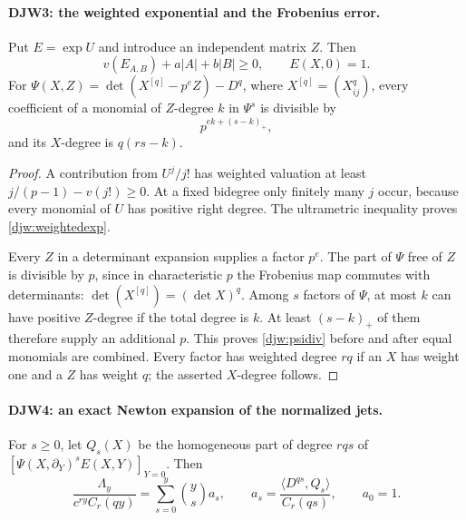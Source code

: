 \documentclass[11pt,a4paper]{article}
\numberwithin{equation}{section}
\theoremstyle{remark}\newtheorem{remark}[theorem]{Remark}
\begin{document}
\paragraph{DJW3: the weighted exponential and the Frobenius error.}
\label{claim:DJW3}
Put $E=\exp U$ and introduce an independent matrix $Z$.
Then
\begin{equation}
 v(E_{A,B})+a|A|+b|B|\ge0,\qquad E(X,0)=1.
 \label{djw:weightedexp}
\end{equation}
For
$\Psi(X,Z)=\det(X^{[q]}-p^eZ)-D^q$, where
$X^{[q]}=(X_{ij}^q)$, every coefficient of a monomial of
$Z$-degree $k$ in $\Psi^s$ is divisible by
\begin{equation}
 p^{ek+(s-k)_+},
 \label{djw:psidiv}
\end{equation}
and its $X$-degree is $q(rs-k)$.

\begin{proof}
A contribution from $U^j/j!$ has weighted valuation at least
$j/(p-1)-v(j!)\ge0$.  At a fixed bidegree only finitely many $j$
occur, because every monomial of $U$ has positive right degree.
The ultrametric inequality proves \eqref{djw:weightedexp}.

Every $Z$ in a determinant expansion supplies a factor $p^e$.
The part of $\Psi$ free of $Z$ is divisible by $p$, since in
characteristic $p$ the Frobenius map commutes with determinants:
$\det(X^{[q]})=(\det X)^q$.
Among $s$ factors of $\Psi$, at most $k$ can have positive
$Z$-degree if the total degree is $k$.  At least $(s-k)_+$ of
them therefore supply an additional $p$.  This proves
\eqref{djw:psidiv} before and after equal monomials are combined.
Every factor has weighted degree $rq$ if an $X$ has weight one
and a $Z$ has weight $q$; the asserted $X$-degree follows.
\end{proof}

\paragraph{DJW4: an exact Newton expansion of the normalized jets.}
\label{claim:DJW4}
For $s\ge0$, let $Q_s(X)$ be the homogeneous part of degree $rqs$
of
$[\Psi(X,\partial_Y)^sE(X,Y)]_{Y=0}$.
Then
\begin{equation}
 \frac{\Lambda_y}{c^{ry}C_r(qy)}
   =\sum_{s=0}^{y}\binom ys a_s,\qquad
 a_s=\frac{\langle D^{qs},Q_s\rangle}{C_r(qs)},\qquad a_0=1.
 \label{djw:newton}
\end{equation}
\end{document}
